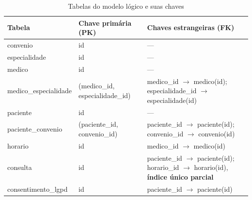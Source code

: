 \documentclass[12pt,a4paper]{extarticle}
\begin{document}
\begin{table}[H]
    \centering
    \caption{Tabelas do modelo lógico e suas chaves}
    \label{tab:chaves-tabelas}

    \small
    \setlength{\tabcolsep}{4pt}

    \begin{tabularx}{\textwidth}{
        >{\raggedright\arraybackslash}p{}
        >{\raggedright\arraybackslash}p{}
        >{\raggedright\arraybackslash}X
    }
        \hline
        \textbf{Tabela} &
        \textbf{Chave primária (PK)} &
        \textbf{Chaves estrangeiras (FK)} \\
        \hline

        convenio
        & id
        & --- \\
        \hline

        especialidade
        & id
        & --- \\
        \hline

        medico
        & id
        & --- \\
        \hline

        medico\_\allowbreak{}especialidade
        & (medico\_\allowbreak{}id, especialidade\_\allowbreak{}id)
        & medico\_\allowbreak{}id $\rightarrow$ medico(id);
          especialidade\_\allowbreak{}id $\rightarrow$ especialidade(id) \\
        \hline

        paciente
        & id
        & --- \\
        \hline

        paciente\_\allowbreak{}convenio
        & (paciente\_\allowbreak{}id, convenio\_\allowbreak{}id)
        & paciente\_\allowbreak{}id $\rightarrow$ paciente(id);
          convenio\_\allowbreak{}id $\rightarrow$ convenio(id) \\
        \hline

        horario
        & id
        & medico\_\allowbreak{}id $\rightarrow$ medico(id) \\
        \hline

        consulta
        & id
        & paciente\_\allowbreak{}id $\rightarrow$ paciente(id);
          horario\_\allowbreak{}id $\rightarrow$ horario(id),
          \textbf{índice único parcial} \\
        \hline

        consentimento\_\allowbreak{}lgpd
        & id
        & paciente\_\allowbreak{}id $\rightarrow$ paciente(id) \\
        \hline


\end{tabularx}
\end{table}
\end{document}
